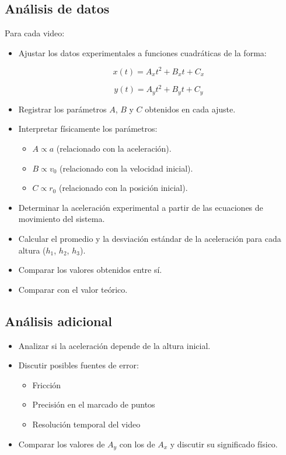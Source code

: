 \subsection*{Análisis de datos}

Para cada video:

\begin{itemize}
\item Ajustar los datos experimentales a funciones cuadráticas de la forma:

\begin{equation}
x(t) = A_x t^2 + B_x t + C_x
\end{equation}

\begin{equation}
y(t) = A_y t^2 + B_y t + C_y
\end{equation}

\item Registrar los parámetros $A$, $B$ y $C$ obtenidos en cada ajuste.
\item Interpretar físicamente los parámetros:
  \begin{itemize}
  \item $A \propto a$ (relacionado con la aceleración).
  \item $B \propto v_0$ (relacionado con la velocidad inicial).
  \item $C \propto r_0$ (relacionado con la posición inicial).
  \end{itemize}
\item Determinar la aceleración experimental a partir de las ecuaciones de movimiento del sistema.

\item Calcular el promedio y la desviación estándar de la aceleración para cada altura ($h_1$, $h_2$, $h_3$).
\item Comparar los valores obtenidos entre sí.
\item Comparar con el valor teórico.
\end{itemize}

\subsection*{Análisis adicional}

\begin{itemize}
\item Analizar si la aceleración depende de la altura inicial.
\item Discutir posibles fuentes de error:
  \begin{itemize}
  \item Fricción
  \item Precisión en el marcado de puntos
  \item Resolución temporal del video
  \end{itemize}
\item Comparar los valores de $A_y$ con los de $A_x$ y discutir su significado físico.
\end{itemize}

